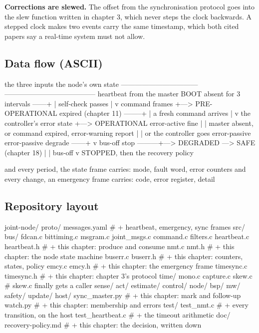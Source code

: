 \textbf{Corrections are slewed.} The offset from the synchronisation protocol
goes into the slew function written in chapter 3, which never steps the clock
backwards. A stepped clock makes two events carry the same timestamp, which both
cited papers say a real-time system must not allow.

\subsection*{Data flow (ASCII)}

\begin{asciiart}
  the three inputs                     the node's own state
  ---------------------------------    ---------------------------------------
  heartbeat from the master            BOOT
    absent for 3 intervals ------+       |  self-check passes
                                 |       v
  command frames                 +---> PRE-OPERATIONAL
    expired (chapter 11) --------+       |  a fresh command arrives
                                 |       v
  the controller's error state   +---> OPERATIONAL
    error-active   fine          |       |  master absent, or command expired,
    error-warning  report        |       |  or the controller goes error-passive
    error-passive  degrade ------+       v
    bus-off        stop ---------+---> DEGRADED  ---> SAFE (chapter 18)
                                         |
                                         |  bus-off
                                         v
                                       STOPPED, then the recovery policy

  and every period, the state frame carries: mode, fault word, error counters
  and every change, an emergency frame carries: code, error register, detail
\end{asciiart}

\subsection*{Repository layout}

\begin{plaincode}
joint-node/
  proto/  messages.yaml              # + heartbeat, emergency, sync frames
  src/
    bus/
      fdcan.c bittiming.c msgram.c joint_msgs.c command.c filters.c
      heartbeat.c heartbeat.h        # + this chapter: produce and consume
      nmt.c       nmt.h              # + this chapter: the node state machine
      buserr.c    buserr.h           # + this chapter: counters, states, policy
      emcy.c      emcy.h             # + this chapter: the emergency frame
      timesync.c  timesync.h         # + this chapter: chapter 3's protocol
    time/  mono.c capture.c skew.c   # skew.c finally gets a caller
    sense/ act/ estimate/ control/ node/ bsp/
    mw/  safety/  update/
  host/
    sync_master.py                   # + this chapter: mark and follow-up
    watch.py                         # + this chapter: membership and errors
  test/
    test_nmt.c                       # + every transition, on the host
    test_heartbeat.c                 # + the timeout arithmetic
  doc/  recovery-policy.md           # + this chapter: the decision, written down
\end{plaincode}

